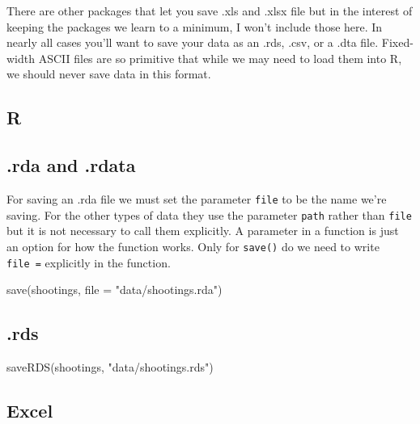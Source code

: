 \documentclass[
]{krantz}
\makeatletter
\newenvironment{Shaded}{\begin{snugshade}}{\end{snugshade}}
\newcommand{\AttributeTok}[1]{\textcolor[rgb]{0.61,0.61,0.61}{#1}}
\newcommand{\FunctionTok}[1]{\textcolor[rgb]{0,0,0}{#1}}
\newcommand{\NormalTok}[1]{#1}
\newcommand{\StringTok}[1]{\textcolor[rgb]{0.5,0.5,0.5}{#1}}
\newenvironment{kframe}{%
\medskip{}
\setlength{\fboxsep}{.8em}
 \def\at@end@of@kframe{}%
 \ifinner\ifhmode%
  \def\at@end@of@kframe{\end{minipage}}%
  \begin{minipage}{\columnwidth}%
 \fi\fi%
 \def\FrameCommand##1{\hskip\@totalleftmargin \hskip-\fboxsep
 \colorbox{shadecolor}{##1}\hskip-\fboxsep
     \hskip-\linewidth \hskip-\@totalleftmargin \hskip\columnwidth}%
 \MakeFramed {\advance\hsize-\width
   \@totalleftmargin\z@ \linewidth\hsize
   \@setminipage}}%
 {\par\unskip\endMakeFramed%
 \at@end@of@kframe}
\renewenvironment{Shaded}{\begin{kframe}}{\end{kframe}}
\makeatother
\begin{document}
There are other packages that let you save .xls and .xlsx
file but in the interest of keeping the packages we learn to
a minimum, I won't include those here. In nearly all cases
you'll want to save your data as an .rds, .csv, or a .dta
file. Fixed-width ASCII files are so primitive that while we
may need to load them into R, we should never save data in
this format.

\hypertarget{r-1}{%
\subsection{R}\label{r-1}}

\hypertarget{rda-and-.rdata}{%
\subsection{.rda and .rdata}\label{rda-and-.rdata}}

For saving an .rda file we must set the parameter
\texttt{file} to be the name we're saving. For the other
types of data they use the parameter \texttt{path} rather
than \texttt{file} but it is not necessary to call them
explicitly. A parameter in a function is just an option for
how the function works. Only for \texttt{save()} do we need
to write \texttt{file\ =} explicitly in the function.

\begin{Shaded}
\begin{Highlighting}[]
\FunctionTok{save}\NormalTok{(shootings, }\AttributeTok{file =} \StringTok{"data/shootings.rda"}\NormalTok{)}
\end{Highlighting}
\end{Shaded}

\hypertarget{rds}{%
\subsection{.rds}\label{rds}}

\begin{Shaded}
\begin{Highlighting}[]
\FunctionTok{saveRDS}\NormalTok{(shootings, }\StringTok{"data/shootings.rds"}\NormalTok{)}
\end{Highlighting}
\end{Shaded}

\hypertarget{excel-1}{%
\subsection{Excel}\label{excel-1}}
\end{document}
